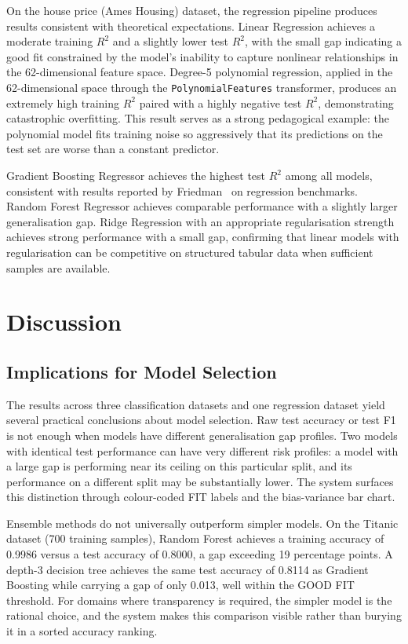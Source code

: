 \documentclass[conference]{IEEEtran}
\begin{document}
On the house price (Ames Housing) dataset, the regression pipeline produces results consistent with theoretical expectations. Linear Regression achieves a moderate training $R^2$ and a slightly lower test $R^2$, with the small gap indicating a good fit constrained by the model's inability to capture nonlinear relationships in the 62-dimensional feature space. Degree-5 polynomial regression, applied in the 62-dimensional space through the \texttt{PolynomialFeatures} transformer, produces an extremely high training $R^2$ paired with a highly negative test $R^2$, demonstrating catastrophic overfitting. This result serves as a strong pedagogical example: the polynomial model fits training noise so aggressively that its predictions on the test set are worse than a constant predictor.

Gradient Boosting Regressor achieves the highest test $R^2$ among all models, consistent with results reported by Friedman~\cite{b13} on regression benchmarks. Random Forest Regressor achieves comparable performance with a slightly larger generalisation gap. Ridge Regression with an appropriate regularisation strength achieves strong performance with a small gap, confirming that linear models with regularisation can be competitive on structured tabular data when sufficient samples are available.

\section{Discussion}

\subsection{Implications for Model Selection}

The results across three classification datasets and one regression dataset yield several practical conclusions about model selection. Raw test accuracy or test F1 is not enough when models have different generalisation gap profiles. Two models with identical test performance can have very different risk profiles: a model with a large gap is performing near its ceiling on this particular split, and its performance on a different split may be substantially lower. The system surfaces this distinction through colour-coded FIT labels and the bias-variance bar chart.

Ensemble methods do not universally outperform simpler models. On the Titanic dataset (700 training samples), Random Forest achieves a training accuracy of 0.9986 versus a test accuracy of 0.8000, a gap exceeding 19 percentage points. A depth-3 decision tree achieves the same test accuracy of 0.8114 as Gradient Boosting while carrying a gap of only 0.013, well within the GOOD FIT threshold. For domains where transparency is required, the simpler model is the rational choice, and the system makes this comparison visible rather than burying it in a sorted accuracy ranking.
\end{document}
